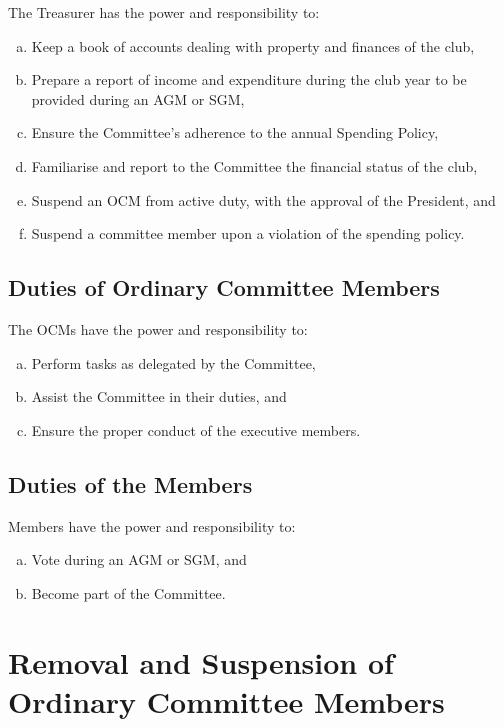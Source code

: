 \documentclass[a4paper,12pt]{article}
\begin{document}
The Treasurer has the power and responsibility to:

\begin{enumerate}[a)]
	\item Keep a book of accounts dealing with property and finances of the club,
	\item Prepare a report of income and expenditure during the club year to be provided during an AGM or SGM,
	\item Ensure the Committee's adherence to the annual Spending Policy,
	\item Familiarise and report to the Committee the financial status of the club,
	\item Suspend an OCM from active duty, with the approval of the President, and
	\item Suspend a committee member upon a violation of the spending policy.
\end{enumerate}

\subsection{Duties of Ordinary Committee Members}

The OCMs have the power and responsibility to:

\begin{enumerate}[a)]
	\item Perform tasks as delegated by the Committee,
	\item Assist the Committee in their duties, and
	\item Ensure the proper conduct of the executive members.
\end{enumerate}

\subsection{Duties of the Members}

Members have the power and responsibility to:

\begin{enumerate}[a)]
	\item Vote during an AGM or SGM, and
	\item Become part of the Committee.
\end{enumerate}

\section{Removal and Suspension of Ordinary Committee Members}
\end{document}
